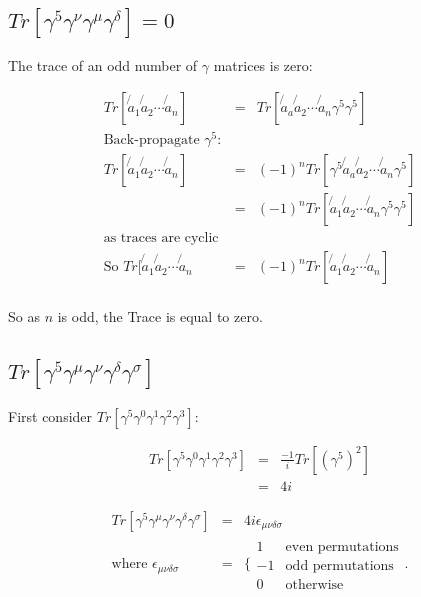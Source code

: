 \subsection{\texorpdfstring{$Tr[\gamma^5\gamma^{\nu}\gamma^{\mu}\gamma^{\delta}] = 0 $}{TrG5GNuGMuGDelta}}

The trace of an odd number of $\gamma$ matrices is zero:

\begin{eqnarray*}
  Tr[\not{a}_1\not{a}_2\cdots\not{a}_n] & = & Tr[\not{a}_a\not{a}_2\cdots\not{a}_n\gamma^5\gamma^5] \\
  \textrm{Back-propagate }\gamma^5: &&\\
  Tr[\not{a}_1\not{a}_2\cdots\not{a}_n] & = & \left(-1\right)^nTr[\gamma^5\not{a}_a\not{a}_2\cdots\not{a}_n\gamma^5] \\
  & = & \left(-1\right)^n Tr[\not{a}_1\not{a}_2\cdots\not{a}_n\gamma^5\gamma^5] \\
  \textrm{as traces are cyclic} &&\\
  \textrm{So } Tr[\not{a}_1\not{a}_2\cdots\not{a}_n & = & \left(-1\right)^nTr[\not{a}_1\not{a}_2\cdots\not{a}_n] \\
\end{eqnarray*}

So as $n$ is odd, the Trace is equal to zero.

\subsection{\texorpdfstring{$Tr[\gamma^5\gamma^{\mu}\gamma^{\nu}\gamma^{\delta}\gamma^{\sigma}]$}{TrG5GMuGNuGDeltaGSigma}}

First consider $Tr[\gamma^5\gamma^0\gamma^1\gamma^2\gamma^3]$:

\begin{eqnarray*}
  Tr[\gamma^5\gamma^0\gamma^1\gamma^2\gamma^3] & = & \frac{-1}{i}Tr\left[\left(\gamma^5\right)^2\right] \\
  & = & 4i
\end{eqnarray*}

\begin{eqnarray*}
  Tr[\gamma^5\gamma^{\mu}\gamma^{\nu}\gamma^{\delta}\gamma^{\sigma}] & = & 4i\epsilon_{\mu\nu\delta\sigma} \\
  \textrm{where } \epsilon_{\mu\nu\delta\sigma} & = &
  \Bigg\{
    \begin{array}{cc}
    1  & \textrm{even permutations} \\
    -1 & \textrm{odd permutations}  \\
    0  & \textrm{otherwise}
    \end{array}
  \Bigg.
\end{eqnarray*}

